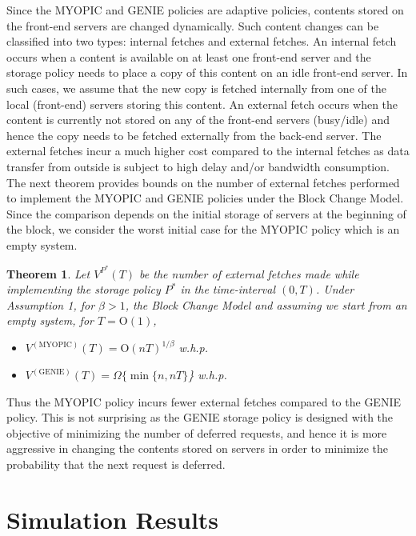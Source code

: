 \documentclass[10pt, conference, letterpaper]{IEEEtran}
\newtheorem{theorem}{Theorem}
\def \OO {\mathrm{O}}
\begin{document}
Since the MYOPIC and GENIE policies are adaptive policies, contents stored on the front-end servers are changed dynamically. Such content changes can be classified into two types: internal fetches and external fetches. An internal fetch occurs when a content is available on at least one front-end server and the storage policy needs to place a copy of this content on an idle front-end server. In such cases, we assume that the new copy is fetched internally from one of the local (front-end) servers storing this content. An external fetch occurs when the content is currently not stored on any of the front-end servers (busy/idle) and hence the copy needs to be fetched externally from the back-end server. The external fetches incur a much higher cost compared to the internal fetches as data transfer from outside is subject to high delay and/or bandwidth consumption. The next theorem provides bounds on the number of external fetches performed to implement the MYOPIC and GENIE policies under the Block Change Model. Since the comparison depends on the initial storage of servers at the beginning of the block, we consider the worst initial case for the MYOPIC policy which is an empty system.
\begin{theorem}
	\label{thm:adaptation_cost}
	Let $V^{P^*}(T)$  be the number of external fetches made while implementing the storage policy $P^*$ in the time-interval $(0,T)$. Under Assumption 1, for $\beta > 1$, the Block Change Model and assuming we start from an empty system, for $T = \OO(1)$,
	\begin{itemize}
		\item [(i)] $V^{(\text{MYOPIC})}(T) = \OO(nT)^{1/\beta}$ w.h.p.
		\item [(ii)] $V^{(\text{GENIE})}(T) = \Omega \{\min \{n, nT \}$\} w.h.p.
	\end{itemize}
\end{theorem}

Thus the MYOPIC policy incurs fewer external fetches compared to the GENIE policy. This is not surprising as the GENIE storage policy is designed with the objective of minimizing the number of deferred requests, and hence it is more aggressive in changing the contents stored on servers in order to minimize the probability that the next request is deferred.

\section{Simulation Results}
\label{sec:simulation_results}
\end{document}
